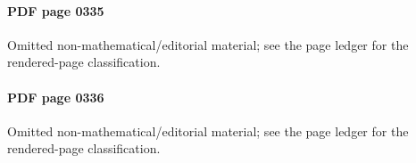 \paragraph{PDF page 0335}\uses{}\label{mcrt-omitted-p0335} Omitted non-mathematical/editorial material; see the page ledger for the rendered-page classification.\par
\paragraph{PDF page 0336}\uses{}\label{mcrt-omitted-p0336} Omitted non-mathematical/editorial material; see the page ledger for the rendered-page classification.\par

